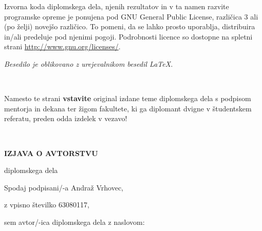 \documentclass[12pt,a4paper,openany]{book}
\begin{document}
\vspace*{1.5cm}
{\small \noindent
Izvorna koda diplomskega dela, njenih rezultatov in v ta namen razvite programske opreme je ponujena pod GNU General Public License,
različica 3 ali (po želji) novejšo različico. To pomeni, da se lahko prosto uporablja, distribuira in/ali predeluje pod njenimi pogoji.
Podrobnosti licence so dostopne na spletni strani \url{http://www.gnu.org/licenses/}.
}

\begin{center}
\vfill
{\em
Besedilo je oblikovano z urejevalnikom besedil \LaTeX.
}
\end{center}

\newpage

\ \thispagestyle{empty}

\newpage


\thispagestyle{empty}

Namesto te strani {\bf vstavite} original izdane teme diplomskega dela s podpisom mentorja in dekana ter \v zigom fakultete, ki ga diplomant
dvigne v študent\-skem referatu,  preden odda izdelek v vezavo!

\newpage


\ \thispagestyle{empty}

\newpage



\thispagestyle{empty}

\vspace{1cm}
\begin{center}
{\Large \textbf{IZJAVA O AVTORSTVU}}
\end{center}

\begin{center}
{\Large diplomskega dela}
\end{center}

\vspace{1cm}
Spodaj podpisani/-a \hspace{0.5cm} Andraž Vrhovec,

\vspace{0.5cm}
z vpisno številko \hspace{0.5cm} 63080117,

\vspace{1cm}
sem avtor/-ica diplomskega dela z naslovom:
\end{document}

